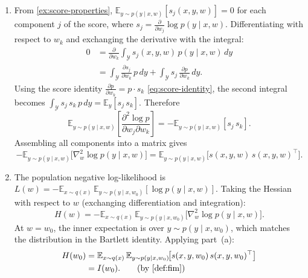 \documentclass[11pt]{article}
\newcommand{\E}{\mathbb{E}}
\newcommand{\Y}{\mathcal{Y}}
\begin{document}
\begin{solution}
\begin{enumerate}
    \item
        From \cref{ex:score-properties}, $\E_{y \sim p(y \mid x, w)}[s_j(x,y,w)]
        = 0$ for each component $j$ of the score, where
        $s_j = \frac{\partial}{\partial w_j} \log p(y \mid x, w)$.
        Differentiating with respect to $w_k$ and exchanging the derivative
        with the integral:
        \begin{align*}
            0
            &= \frac{\partial}{\partial w_k}
                \int_\Y s_j(x,y,w)\, p(y \mid x, w)\, dy
        \\  &= \int_\Y
                \frac{\partial s_j}{\partial w_k}\, p\, dy
                + \int_\Y s_j\, \frac{\partial p}{\partial w_k}\, dy.
                \tag{product rule}
        \end{align*}
        Using the score identity
        $\frac{\partial p}{\partial w_k} = p \cdot s_k$
        \eqref{eq:score-identity}, the second integral becomes
        $\int_\Y s_j\, s_k\, p\, dy = \E_y[s_j\, s_k]$. Therefore
        \begin{equation*}
            \E_{y \sim p(y \mid x, w)}\!\left[
                \frac{\partial^2 \log p}{\partial w_j \partial w_k}
            \right]
            = -\E_{y \sim p(y \mid x, w)}[s_j\, s_k].
        \end{equation*}
        Assembling all components into a matrix gives
        \begin{equation*}
            -\E_{y \sim p(y \mid x, w)}\!\bigl[
                \nabla_w^2 \log p(y \mid x, w)
            \bigr]
            =
            \E_{y \sim p(y \mid x, w)}\!\bigl[
                s(x,y,w)\, s(x,y,w)^\top
            \bigr].
        \end{equation*}

    \item
        The population negative log-likelihood is
        $L(w) = -\E_{x \sim q(x)}\, \E_{y \sim p(y \mid x, w_0)}
            [\log p(y \mid x, w)]$.
        Taking the Hessian with respect to $w$ (exchanging differentiation and
        integration):
        \begin{equation*}
            H(w)
            = -\E_{x \sim q(x)}\,
              \E_{y \sim p(y \mid x, w_0)}\!\bigl[
                \nabla_w^2 \log p(y \mid x, w)
              \bigr].
        \end{equation*}
        At $w = w_0$, the inner expectation is over
        $y \sim p(y \mid x, w_0)$, which matches the distribution in the
        Bartlett identity. Applying part~(a):
        \begin{align*}
            H(w_0)
            &= \E_{x \sim q(x)}\,
              \E_{y \sim p(y \mid x, w_0)}\!\bigl[
                s(x,y,w_0)\, s(x,y,w_0)^\top
              \bigr]
        \\  &= I(w_0).
            \tag{by \cref{def:fim}}
        \end{align*}


\end{enumerate}
\end{solution}
\end{document}
